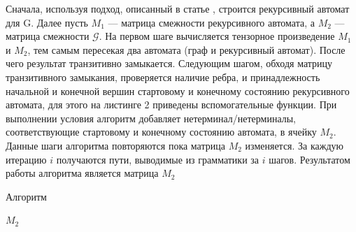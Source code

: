 \documentclass[14pt]{matmex-diploma}
\theoremstyle{definition}
\begin{document}
Сначала, используя подход, описанный в статье \cite{rec}, строится рекурсивный автомат для G. Далее пусть $M_{1}$ --- матрица смежности рекурсивного автомата, а $M_{2}$ --- матрица смежности $\mathcal{G}$. На первом шаге вычисляется тензорное произведение $M_{1}$ и $M_{2}$, тем самым пересекая два автомата (граф и рекурсивный автомат). После чего результат транзитивно замыкается. Следующим шагом, обходя матрицу транзитивного замыкания, проверяется наличие ребра, и принадлежность начальной и конечной вершин стартовому и конечному состоянию рекурсивного автомата, для этого на листинге 2 приведены вспомогательные функции. При выполнении условия алгоритм добавляет нетерминал/нетерминалы, соответствующие стартовому и конечному состоянию автомата, в ячейку $M_{2}$. Данные шаги алгоритма повторяются пока матрица $M_{2}$ изменяется. За каждую итерацию $i$ получаются пути, выводимые из грамматики за $i$ шагов. Результатом работы алгоритма является матрица $M_{2}$

\begin{algorithm}[H]
\begin{algorithmic}[1]
\caption{Алгоритм}
\label{tensor:cfpq}
        \EndFor
    \EndFor
                    \EndIf
                \EndIf
           \EndFor
        \EndFor
    \EndWhile
\State \Return $M_2$
\EndFunction
\end{algorithmic}
\end{algorithm}
\end{document}
